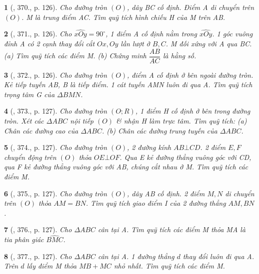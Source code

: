 \documentclass{article}
\newtheorem{baitoan}{}
\begin{document}
\begin{baitoan}[\cite{Binh_Toan_9_tap_2}, 370., p. 126]
	Cho đường tròn $(O)$, dây BC cố định. Điểm A di chuyển trên $(O)$. M là trung điểm AC. Tìm quỹ tích hình chiếu H của M trên AB.
\end{baitoan}

\begin{baitoan}[\cite{Binh_Toan_9_tap_2}, 371., p. 126]
	Cho $\widehat{xOy} = 90^\circ$, 1 điểm A cố định nằm trong $\widehat{xOy}$. 1 góc vuông đỉnh A có 2 cạnh thay đổi cắt $Ox,Oy$ lần lượt ở $B,C$. M đối xứng với A qua BC. (a) Tìm quỹ tích các điểm M. (b) Chứng minh $\dfrac{AB}{AC}$ là hằng số.
\end{baitoan}

\begin{baitoan}[\cite{Binh_Toan_9_tap_2}, 372., p. 126]
	Cho đường tròn $(O)$, điểm A cố định ở bên ngoài đường tròn. Kẻ tiếp tuyến AB, B là tiếp điểm. 1 cát tuyến AMN luôn đi qua A. Tìm quỹ tích trọng tâm G của $\Delta BMN$.
\end{baitoan}

\begin{baitoan}[\cite{Binh_Toan_9_tap_2}, 373., p. 127]
	Cho đường tròn $(O;R)$, 1 điểm H cố định ở bên trong đường tròn. Xét các $\Delta ABC$ nội tiếp $(O)$ \& nhận H làm trực tâm. Tìm quỹ tích: (a) Chân các đường cao của $\Delta ABC$. (b) Chân các đường trung tuyến của $\Delta ABC$.
\end{baitoan}

\begin{baitoan}[\cite{Binh_Toan_9_tap_2}, 374., p. 127]
	Cho đường tròn $(O)$, 2 đường kính $AB\bot CD$. 2 điểm $E,F$ chuyển động trên $(O)$ thỏa $OE\bot OF$. Qua E kẻ đường thẳng vuông góc với CD, qua F kẻ đường thẳng vuông góc với AB, chúng cắt nhau ở M. Tìm quỹ tích các điểm M.
\end{baitoan}

\begin{baitoan}[\cite{Binh_Toan_9_tap_2}, 375., p. 127]
	Cho đường tròn $(O)$, dây AB cố định. 2 điểm $M,N$ di chuyển trên $(O)$ thỏa $AM = BN$. Tìm quỹ tích giao điểm I của 2 đường thẳng $AM,BN$.
\end{baitoan}

\begin{baitoan}[\cite{Binh_Toan_9_tap_2}, 376., p. 127]
	Cho $\Delta ABC$ cân tại A. Tìm quỹ tích các điểm M thỏa MA là tia phân giác $\widehat{BMC}$.
\end{baitoan}

\begin{baitoan}[\cite{Binh_Toan_9_tap_2}, 377., p. 127]
	Cho $\Delta ABC$ cân tại A. 1 đường thẳng $d$ thay đổi luôn đi qua A. Trên $d$ lấy điểm M thỏa $MB + MC$ nhỏ nhất. Tìm quỹ tích các điểm M.
\end{baitoan}
\end{document}
